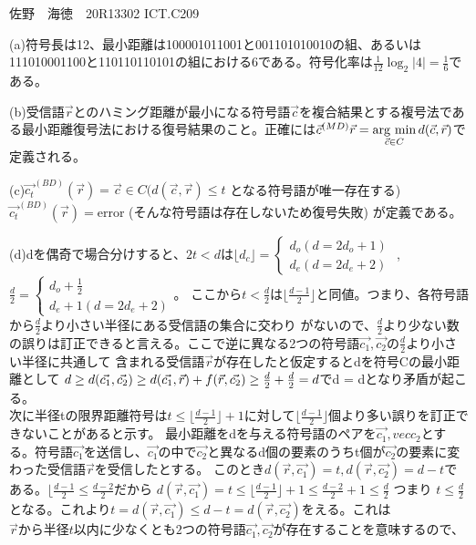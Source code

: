 \documentclass[11pt]{jsarticle}
\newcommand{\argmin}{\mathop{\rm arg~min}\limits}
\begin{document}
佐野　海徳　20R13302 ICT.C209\\
\par(a)符号長は12、最小距離は100001011001と001101010010の組、あるいは111010001100と110110110101の組における6である。符号化率は$\frac{1}{12}\log_2|4| = \frac{1}{6}$である。
\par(b)受信語$\vec{r}$とのハミング距離が最小になる符号語$\vec{c}$を複合結果とする複号法である最小距離復号法における復号結果のこと。正確には$\vec{c}^{(MD)}\vec{r} = \argmin_{\vec{c} \in C} d(\vec{c},\vec{r})$で定義される。
\par(c)$\vec{c_t}^{(BD)}(\vec{r}) = \vec{c}\in C (d(\vec{c},\vec{r})\leq t$ となる符号語が唯一存在する)
$\vec{c_t}^{(BD)}(\vec{r}) = $error (そんな符号語は存在しないため復号失敗) が定義である。
\par(d)dを偶奇で場合分けすると、$2t < d$は$
\lfloor d_c \rfloor
 =
\left\{
\begin{array}{l}
d_o (d = 2d_o + 1) \\
d_e(d = 2d_e + 2)
\end{array}
\right.$
,$\frac{d}{2} = \left\{
\begin{array}{l}
d_o + \frac{1}{2} \\
d_e + 1 (d = 2d_e + 2)
\end{array}
\right.$。
ここから$t < \frac{d}{2}$は$
\lfloor \frac{d - 1}{2}\rfloor
$と同値。つまり、各符号語から$\frac{d}{2}$より小さい半径にある受信語の集合に交わり
がないので、$\frac{d}{2}$より少ない数の誤りは訂正できると言える。ここで逆に異なる2つの符号語$\vec{c_1},\vec{c_2}$の$\frac{d}{2}$より小さい半径に共通して
含まれる受信語$\vec{r}$が存在したと仮定するとdを符号Cの最小距離として
$d \geq d(\vec{c_1},\vec{c_2}) \\
    \geq d(\vec{c_1},\vec{r}) + f(\vec{r},\vec{c_2}) \\
    \geq \frac{d}{2} + \frac{d}{2} = d$でd = dとなり矛盾が起こる。\\
次に半径tの限界距離符号は$t \leq \lfloor \frac{d - 1}{2} \rfloor + 1$に対して$\lfloor\frac{d - 1}{2}\rfloor$個より多い誤りを訂正できないことがあると示す。
最小距離をdを与える符号語のペアを$\vec{c_1},vec{c_2}$とする。符号語$\vec{c_1}$を送信し、$\vec{c_1}$の中で$\vec{c_2}$と異なるd個の要素のうちt個が$\vec{c_2}$の要素に変わった受信語$\vec{r}$を受信したとする。
このとき$d(\vec{r},\vec{c_1}) = t, d(\vec{r},\vec{c_2}) = d - t$である。$\lfloor \frac{d - 1}{2} \leq \frac{d - 2}{2}$だから
$d(\vec{r},\vec{c_1}) = t \leq \lfloor\frac{d - 1}{2}\rfloor + 1 \leq \frac{d - 2}{2} + 1 \leq \frac{d}{2}$
つまり $t \leq \frac{d}{2}$となる。これより$t = d(\vec{r},\vec{c_1})\leq d - t = d(\vec{r},\vec{c_2})$をえる。これは$\vec{r}から半径t以内に少なくとも2つの符号語\vec{c_1},\vec{c_2}$が存在することを意味するので、
\end{document}
